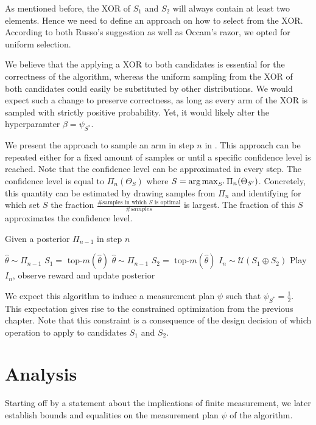As mentioned before, the XOR of $S_1$ and $S_2$ will always contain at least two
elements. Hence we need to define an approach on how to select from the XOR.
According to both Russo's suggestion as well as Occam's razor, we opted for
uniform selection.

We believe that the applying a XOR to both candidates is essential for the
correctness of the algorithm, whereas the uniform sampling from the XOR of both
candidates could easily be substituted by other distributions. We would expect
such a change to preserve correctness, as long as every arm of the XOR is
sampled with strictly positive probability. Yet, it would likely alter the
hyperparamter $\beta = \psi_{S^*}$.

We present the approach to sample an arm in step $n$ in .
This approach can be repeated either for a fixed amount of samples or until a
specific confidence level is reached. Note that the confidence level can be
approximated in every step. The confidence level is equal to $\Pi_n(\Theta_S)$
where $S = \operatorname*{arg\,max}_{S'} \Pi_n(\Theta_{S'})$. Concretely, this quantity can be
estimated by drawing samples from $\Pi_n$ and identifying for which set $S$ the
fraction $\frac{\text{\# samples in which $S$ is optimal}}{\#samples}$ is
largest. The fraction of this $S$ approximates the confidence level.
\begin{algorithm}[H]
  \caption{Given a posterior $\Pi_{n-1}$ in step $n$}
  \label{alg:TXTS}
  \begin{algorithmic}
    \State $\hat{\theta} \sim \Pi_{n-1}$
    \State $S_1 =$ top-$m(\hat{\theta})$
    \Repeat
      \State $\hat{\theta} \sim \Pi_{n-1}$
      \State $S_2 = $ top-$m(\hat{\theta})$
    \State $I_n \sim \mathcal{U}(S_1 \oplus S_2)$
    \State Play $I_n$, observe reward and update posterior
  \end{algorithmic}
\end{algorithm}
We expect this algorithm to induce a measurement plan $\psi$ such that
$\psi_{S^*} = \frac{1}{2}$. This expectation gives rise to the constrained
optimization from the previous chapter. Note that this constraint is a
consequence of the design decision of which operation to apply to candidates
$S_1$ and $S_2$.

\section{Analysis}\label{section:analysis}
Starting off by a statement about the implications of finite measurement, we
later establish bounds and equalities on the measurement plan $\psi$ of the
algorithm.

